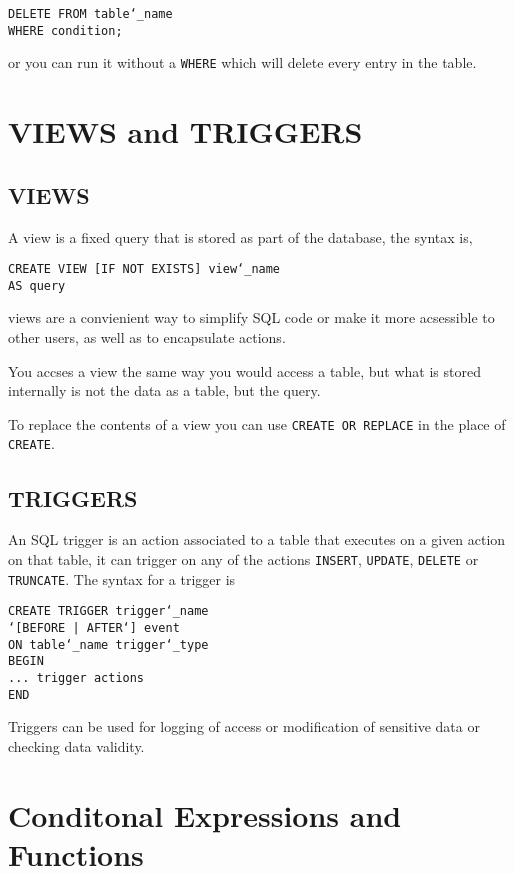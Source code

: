 \documentclass[10pt, english]{article}
\begin{document}
\texttt{DELETE FROM table\char`_name \\
WHERE condition;
}

or you can run it without a \texttt{WHERE} which will delete every entry in the table.

\section{VIEWS and TRIGGERS}
\subsection{VIEWS}
A view is a fixed query that is stored as part of the database, the syntax is,

\texttt{CREATE VIEW [IF NOT EXISTS] view\char`_name \\
AS
query}

views are a convienient way to simplify SQL code or make it more acsessible to other users, as well as to 
encapsulate actions.

You accses a view the same way you would access a table, but what is stored internally is not the data as a table, but the
query.

To replace the contents of a view you can use \texttt{CREATE OR REPLACE} in the place of \texttt{CREATE}.

\subsection{TRIGGERS}
An SQL trigger is an action associated to a table that executes on a given action on that table, it can trigger on any of the actions
\texttt{INSERT}, \texttt{UPDATE}, \texttt{DELETE} or \texttt{TRUNCATE}. The syntax for a trigger is 

\texttt{CREATE TRIGGER trigger\char`_name \\
\char`[BEFORE | AFTER\char`] event \\
ON table\char`_name trigger\char`_type \\
BEGIN  \\
\hspace*{10pt} ... trigger actions \\
END }

Triggers can be used for logging of access or modification of sensitive data or checking data validity.

\section{Conditonal Expressions and Functions}
\end{document}
